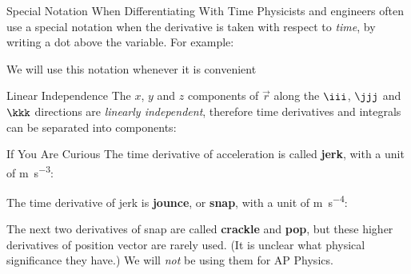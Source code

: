 \documentclass[12pt,compress,aspectratio=169,dvipsnames]{beamer}
\begin{document}
\begin{frame}{Special Notation When Differentiating With Time}
  Physicists and engineers often use a special notation when the derivative is
  taken with respect to \emph{time}, by writing a dot above the variable. For
  example:

  \vspace{-.3in}{\large
    \begin{align*}
      v &= \dot r \\
      a &= \dot v =\ddot r
    \end{align*}
  }

  We will use this notation whenever it is convenient
\end{frame}



\begin{frame}{Linear Independence}
  The $x$, $y$ and $z$ components of $\vec r$ along the $\iii$, $\jjj$ and
  $\kkk$ directions are \emph{linearly independent}, therefore time
  derivatives and integrals can be separated into components:

\end{frame}



\begin{frame}{If You Are Curious}
  The time derivative of acceleration is called \textbf{jerk}, with a unit
  of \si{\metre\per\second\cubed}:


  The time derivative of jerk is \textbf{jounce}, or \textbf{snap}, with a
  unit of \si{\metre\per\second^4}:
  
  
  The next two derivatives of snap are called \textbf{crackle} and
  \textbf{pop}, but these higher derivatives of position vector are rarely used.
  (It is unclear what physical significance they have.) We will \emph{not} be
  using them for AP Physics.
\end{frame}
\end{document}
